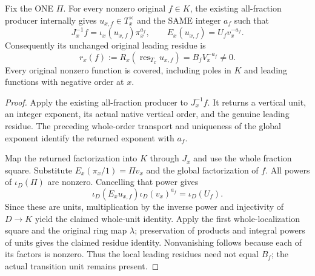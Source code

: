 \begin{theorem}
\label{thm:gauss-leading-local-unit-transformation}
\leanok
Fix the ONE $\Pi$. For every nonzero original $f\in K$, the existing
all-fraction producer internally gives $u_{x,f}\in T_x^\times$ and
the SAME integer $a_f$ such that
\[
 J_x^{-1}f=\iota_x(u_{x,f})\pi_x^{a_f},\qquad
 E_x(u_{x,f})=U_fv_x^{-a_f}.
\]
Consequently its unchanged original leading residue is
\[
 r_x(f):=R_x(\operatorname{res}_{T_x}u_{x,f})
       =B_fV_x^{-a_f}\ne0.
\]
Every original nonzero function is covered, including poles in $K$ and
leading functions with negative order at $x$.
\end{theorem}
\begin{proof}
Apply the existing all-fraction producer to $J_x^{-1}f$. It returns a
vertical unit, an integer exponent, its actual native vertical order,
and the genuine leading residue. The preceding whole-order transport
and uniqueness of the global exponent identify the returned exponent
with $a_f$.

Map the returned factorization into $K$ through $J_x$ and use the whole
fraction square. Substitute
$E_x(\pi_x/1)=\Pi v_x$ and the global factorization of $f$.
All powers of $\iota_D(\Pi)$ are nonzero. Cancelling that power gives
\[
 \iota_D(E_xu_{x,f})\iota_D(v_x)^{a_f}=\iota_D(U_f).
\]
Since these are units, multiplication by the inverse power and
injectivity of $D\to K$ yield the claimed whole-unit identity.
Apply the first whole-localization square and the original ring map
$\lambda$; preservation of products and integral powers of units gives
the claimed residue identity. Nonvanishing follows because each of its
factors is nonzero. Thus the local leading residues need not equal
$B_f$; the actual transition unit remains present.
\end{proof}

